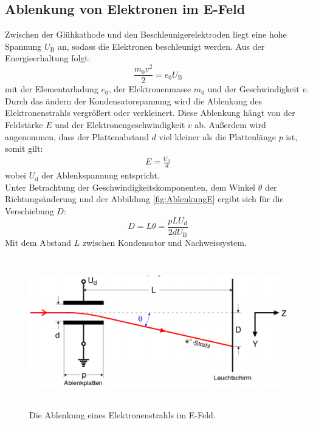 \subsection{Ablenkung von Elektronen im E-Feld}
Zwischen der Glühkathode und den Beschleunigerelektroden liegt eine hohe Spannung $U_\text{B}$ an, sodass die Elektronen beschleunigt werden. Aus der Energieerhaltung folgt:
\begin{equation}
	\frac{m_0 v^2}{2} = e_0 U_\text{B}
\end{equation}
mit der Elementarladung $e_0$, der Elektronenmasse $m_0$ und der Geschwindigkeit $v$. \\
Durch das ändern der Kondensatorspannung wird die Ablenkung des Elektronenstrahls vergrößert oder verkleinert. Diese Ablenkung hängt von der Feldstärke $E$ und der Elektronengeschwindigkeit $v$ ab. Außerdem wird angenommen, dass der Plattenabstand $d$ viel kleiner als die Plattenlänge $p$ ist, somit gilt:
\begin{align*}
	E = \frac{U_\text{d}}{d}
\end{align*}
wobei $U_\text{d}$ der Ablenkspannung entspricht. \\
Unter Betrachtung der Geschwindigkeitskomponenten, dem Winkel $\theta$ der Richtungsänderung und der Abbildung \eqref{fig:AblenkungE} ergibt sich für die Verschiebung $D$:
\begin{equation}
	D = L\theta = \frac{p L U_\text{d}}{2 d U_\text{B}}
	\label{eqn:DUd}
\end{equation}
Mit dem Abstand $L$ zwischen Kondensator und Nachweissystem. \\

\begin{figure}[H]
	\centering
	\includegraphics[height=6.5cm]{picture/AblenkungEFeld}
	\caption{Die Ablenkung eines Elektronenstrahls im E-Feld. \cite[3]{V501}}
	\label{fig:AblenkungE}
\end{figure}

